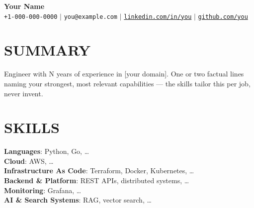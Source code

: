 \documentclass[letterpaper,11pt]{article}
\begin{document}
\begin{center}
    \textbf{\Huge Your Name} \\ \vspace{5pt}
    \small \texttt{+1-000-000-0000} \hspace{1pt} $|$
    \hspace{1pt} \texttt{you@example.com} \hspace{1pt} $|$
    \hspace{1pt} \href{https://www.linkedin.com/in/you}{\texttt{linkedin.com/in/you}} \hspace{1pt} $|$
    \hspace{1pt} \href{https://github.com/you}{\texttt{github.com/you}} \hspace{1pt} \\ \vspace{-3pt}
\end{center}

\section{SUMMARY}
\begin{itemize}[leftmargin=0in, label={}]
    \small{\item{Engineer with N years of experience in [your domain]. One or two
    factual lines naming your strongest, most relevant capabilities — the skills
    tailor this per job, never invent.}}
\end{itemize}

\section{SKILLS}
\begin{itemize}[leftmargin=0in, label={}]
    \small{\item{
     \textbf{Languages}{: Python, Go, \dots} \\
     \textbf{Cloud}{: AWS, \dots} \\
     \textbf{Infrastructure As Code}{: Terraform, Docker, Kubernetes, \dots} \\
     \textbf{Backend \& Platform}{: REST APIs, distributed systems, \dots} \\
     \textbf{Monitoring}{: Grafana, \dots} \\
     \textbf{AI \& Search Systems}{: RAG, vector search, \dots}
    }}
\end{itemize}
\end{document}

